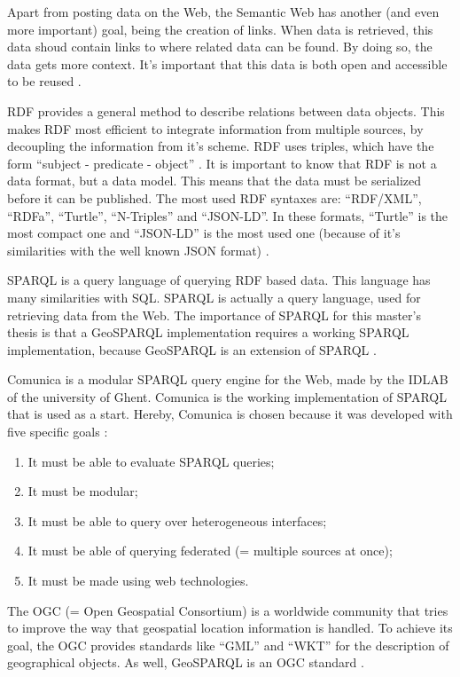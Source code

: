 \documentclass[twocolumn]{phdsymp} %
\begin{document}
Apart from posting data on the Web, the Semantic Web has another (and even more important) goal, being the creation of links. When data is retrieved, this data shoud contain links to where related data can be found. By doing so, the data gets more context. It's important that this data is both open and accessible to be reused \cite{berners2001semantic}.

RDF provides a general method to describe relations between data objects. This makes RDF most efficient to integrate information from multiple sources, by decoupling the information from it's scheme. RDF uses triples, which have the form ``subject - predicate - object'' \cite{lassila1998resource}. It is important to know that RDF is not a data format, but a data model. This means that the data must be serialized before it can be published. The most used RDF syntaxes are: ``RDF/XML'', ``RDFa'', ``Turtle'', ``N-Triples'' and ``JSON-LD''. In these formats, ``Turtle'' is the most compact one and ``JSON-LD'' is the most used one (because of it's similarities with the well known JSON format) \cite{heath2011linked}.

SPARQL is a query language of querying RDF based data. This language has many similarities with SQL. SPARQL is actually a query language, used for retrieving data from the Web. The importance of SPARQL for this master's thesis is that a GeoSPARQL implementation requires a working SPARQL implementation, because GeoSPARQL is an extension of SPARQL \cite{sparql2013querylanguage}.

Comunica is a modular SPARQL query engine for the Web, made by the IDLAB of the university of Ghent. Comunica is the working implementation of SPARQL that is used as a start. Hereby, Comunica is chosen because it was developed with five specific goals \cite{taelman2018comunica}:
\begin{enumerate}
    \item It must be able to evaluate SPARQL queries; 
    \item It must be modular;
    \item It must be able to query over heterogeneous interfaces;
    \item It must be able of querying federated (= multiple sources at once);
    \item It must be made using web technologies.
\end{enumerate}

The OGC (= Open Geospatial Consortium) is a worldwide community that tries to improve the way that geospatial location information is handled. To achieve its goal, the OGC provides standards like ``GML'' and ``WKT'' for the description of geographical objects. As well, GeoSPARQL is an OGC standard \cite{ogcdocs}.
\end{document}
